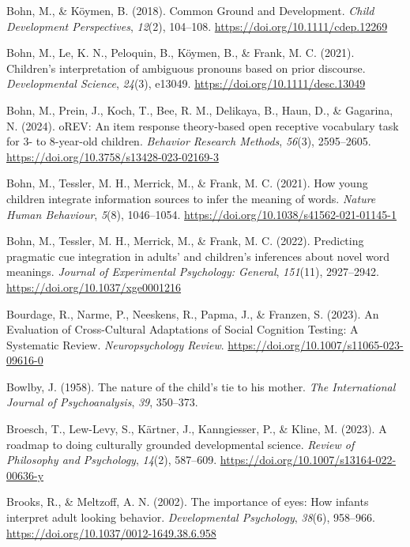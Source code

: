 \documentclass[
]{scrbook}
\newlength{\cslhangindent}
\newenvironment{CSLReferences}[2] %
 {\begin{list}{}{%
  \setlength{\itemindent}{0pt}
  \setlength{\leftmargin}{0pt}
  \setlength{\parsep}{0pt}
  \ifodd #1
   \setlength{\leftmargin}{\cslhangindent}
   \setlength{\itemindent}{-1\cslhangindent}
  \fi
  \setlength{\itemsep}{#2\baselineskip}}}
 {\end{list}}
\begin{document}
\begin{CSLReferences}{1}{0}
Bohn, M., \& Köymen, B. (2018). Common {Ground} and {Development}. \emph{Child Development Perspectives}, \emph{12}(2), 104--108. \url{https://doi.org/10.1111/cdep.12269}

Bohn, M., Le, K. N., Peloquin, B., Köymen, B., \& Frank, M. C. (2021). Children's interpretation of ambiguous pronouns based on prior discourse. \emph{Developmental Science}, \emph{24}(3), e13049. \url{https://doi.org/10.1111/desc.13049}

Bohn, M., Prein, J., Koch, T., Bee, R. M., Delikaya, B., Haun, D., \& Gagarina, N. (2024). {oREV}: {An} item response theory-based open receptive vocabulary task for 3- to 8-year-old children. \emph{Behavior Research Methods}, \emph{56}(3), 2595--2605. \url{https://doi.org/10.3758/s13428-023-02169-3}

Bohn, M., Tessler, M. H., Merrick, M., \& Frank, M. C. (2021). How young children integrate information sources to infer the meaning of words. \emph{Nature Human Behaviour}, \emph{5}(8), 1046--1054. \url{https://doi.org/10.1038/s41562-021-01145-1}

Bohn, M., Tessler, M. H., Merrick, M., \& Frank, M. C. (2022). Predicting pragmatic cue integration in adults' and children's inferences about novel word meanings. \emph{Journal of Experimental Psychology: General}, \emph{151}(11), 2927--2942. \url{https://doi.org/10.1037/xge0001216}

Bourdage, R., Narme, P., Neeskens, R., Papma, J., \& Franzen, S. (2023). An {Evaluation} of {Cross-Cultural Adaptations} of {Social Cognition Testing}: {A Systematic Review}. \emph{Neuropsychology Review}. \url{https://doi.org/10.1007/s11065-023-09616-0}

Bowlby, J. (1958). The nature of the child's tie to his mother. \emph{The International Journal of Psychoanalysis}, \emph{39}, 350--373.

Broesch, T., Lew-Levy, S., Kärtner, J., Kanngiesser, P., \& Kline, M. (2023). A roadmap to doing culturally grounded developmental science. \emph{Review of Philosophy and Psychology}, \emph{14}(2), 587--609. \url{https://doi.org/10.1007/s13164-022-00636-y}

Brooks, R., \& Meltzoff, A. N. (2002). The importance of eyes: {How} infants interpret adult looking behavior. \emph{Developmental Psychology}, \emph{38}(6), 958--966. \url{https://doi.org/10.1037/0012-1649.38.6.958}


\end{CSLReferences}
\end{document}
